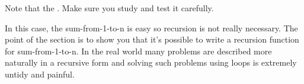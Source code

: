 Note that the . Make sure
you study and test it carefully.


In this case, the sum-from-1-to-n is easy so recursion is not really
necessary. The point of the section is to show you that
it's possible to write a recursion function for
sum-from-1-to-n. In the real world many problems are described more
naturally in a recursive form and solving such problems using loops is
extremely untidy and painful.








